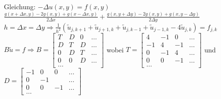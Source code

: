 Gleichung:    $-\Delta u(x,y)= f(x,y) $
$\frac{g(x+\Delta x,y ) -2 g(x,y)+ g(x-\Delta x,y)}{2\Delta x} +
\frac{g(x,y+\Delta y) -2 g(x,y)+ g(x,y-\Delta y)}{2\Delta y}$\\

$h=\Delta x = \Delta y \Rightarrow \boxed{\frac 1 {h^2} (\tilde{u}_{j,k+1} +
\tilde{u}_{j+1,k} + \tilde{u}_{j,k-1} + \tilde{u}_{j-1,k} - 4 \tilde{u}_{j,k})
= f_{j, k}}$\\[0.4cm]


$B \tilde{u} = f \Rightarrow B= \begin{bmatrix}
             T& D & 0 & \ldots \\
             D& T & D & \ldots \\
              0& D & T & \ldots \\
              0& 0 & D & \ldots \\
             \ldots 
           \end{bmatrix}$
wobei $T=\begin{bmatrix}
             4& -1 & 0 & \ldots \\
             -1& 4 & -1 & \ldots \\
              0& -1 & 4 & \ldots \\
              0& 0 & -1 & \ldots \\
             \ldots 
           \end{bmatrix}$
und $D=\begin{bmatrix}
             -1& 0& 0 & \ldots \\
             0 & -1 &  & \ldots \\
              0& 0&-1 & \ldots \\
             \ldots 
           \end{bmatrix}$

           
